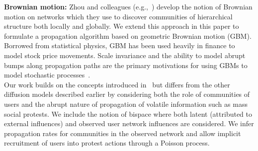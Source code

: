 \vspace{-0.1in}
\noindent
{\bf Brownian motion:}
Zhou and colleagues (e.g.,~\cite{zhou2003distance, zhou2003network,
zhou2004network}) develop the notion of Brownian motion on networks
which they
use to discover communities of hierarchical structure both locally
and globally. We extend this approach in this paper
to formulate a propagation algorithm based on geometric Brownian
motion (GBM). Borrowed from statistical physics, GBM has been
used heavily in finance to model stock price movements.
Scale invariance and the ability to model abrupt bumps
along propagation paths are the primary motivations for using GBMs
to model stochastic processes~\cite{tankov2004financial}. \\

\vspace{-0.1in}
\noindent
Our work builds on the concepts
introduced in~\cite{zhou2003network, iwata2013discovering, zhou2003distance, zhou2004network} but differs from the other diffusion models
described earlier by considering both the role of communities of
users and the abrupt nature of propagation of volatile information such as mass social protests. We include the notion of bispace where both latent (attributed to external influences) and observed user network influences are considered. We infer propagation rates for communities in the observed network and allow
implicit recruitment of users into protest actions through a Poisson process.
